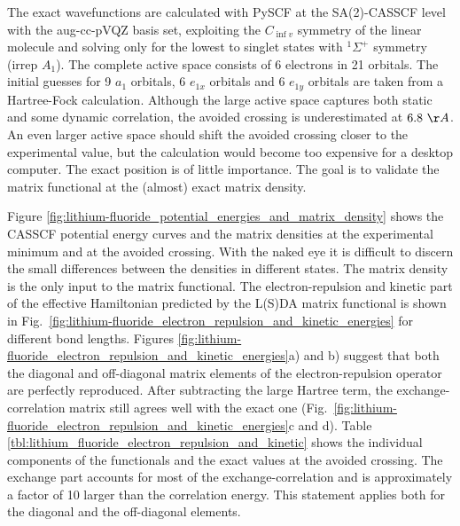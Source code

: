 \documentclass[journal=jacsat,manuscript=article]{achemso}
\begin{document}
The exact wavefunctions are calculated with PySCF \cite{Sun2020} at the SA(2)-CASSCF level
with the aug-cc-pVQZ basis set\cite{Dunning1989gaussianI,Kendall1992electron,basis_set_exchange},
exploiting the $C_{\inf v}$ symmetry of the linear molecule and solving only for the lowest to singlet states
with $^1\Sigma^+$ symmetry (irrep $A_1$). The complete active space consists of 6 electrons in 21 orbitals.
The initial guesses for 9 $a_1$ orbitals, 6 $e_{1x}$ orbitals and 6 $e_{1y}$ orbitals are taken from a Hartree-Fock calculation.
Although the large active space captures
both static and some dynamic correlation, the avoided crossing is underestimated at $6.8~\AA$. An even larger active space
should shift the avoided crossing closer to the experimental value, but the calculation would become too
expensive for a desktop computer. The exact position is of little importance. 
The goal is to validate the matrix functional at the (almost) exact matrix density.

Figure \ref{fig:lithium-fluoride_potential_energies_and_matrix_density} shows the CASSCF potential energy curves
and the matrix densities at the experimental minimum and at the avoided crossing.
With the naked eye it is difficult to discern the small differences between the densities in different states.
The matrix density is the only input to the matrix functional. 
The electron-repulsion and kinetic part of the effective Hamiltonian predicted by the L(S)DA matrix functional
is shown in Fig.~\ref{fig:lithium-fluoride_electron_repulsion_and_kinetic_energies} for different bond lengths. 
Figures \ref{fig:lithium-fluoride_electron_repulsion_and_kinetic_energies}a) and b)
suggest that both the diagonal and off-diagonal matrix elements of the electron-repulsion operator are
perfectly reproduced. After subtracting the large Hartree term, the exchange-correlation matrix still agrees
well with the exact one (Fig.~\ref{fig:lithium-fluoride_electron_repulsion_and_kinetic_energies}c and d).
Table \ref{tbl:lithium_fluoride_electron_repulsion_and_kinetic} shows the individual components of the functionals
and the exact values at the avoided crossing.
The exchange part accounts for most of the exchange-correlation and is approximately a factor of 10 larger than the correlation energy.
This statement applies both for the diagonal and the off-diagonal elements.
\end{document}
